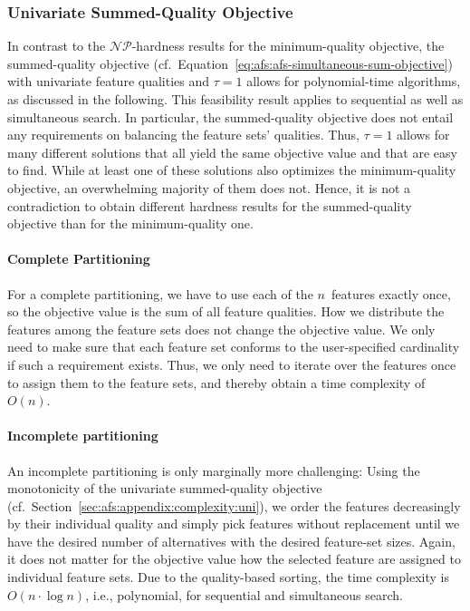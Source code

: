\documentclass{article}
\theoremstyle{definition}
\begin{document}
\subsubsection{Univariate Summed-Quality Objective}
\label{sec:afs:appendix:complexity:uni-sum}

In contrast to the $\mathcal{NP}$-hardness results for the minimum-quality objective, the summed-quality objective (cf.~Equation~\ref{eq:afs:afs-simultaneous-sum-objective}) with univariate feature qualities and $\tau=1$ allows for polynomial-time algorithms, as discussed in the following.
This feasibility result applies to sequential as well as simultaneous search.
In particular, the summed-quality objective does not entail any requirements on balancing the feature sets' qualities.
Thus, $\tau=1$ allows for many different solutions that all yield the same objective value and that are easy to find.
While at least one of these solutions also optimizes the minimum-quality objective, an overwhelming majority of them does not.
Hence, it is not a contradiction to obtain different hardness results for the summed-quality objective than for the minimum-quality one.

\paragraph{Complete Partitioning}

For a complete partitioning, we have to use each of the $n$~features exactly once, so the objective value is the sum of all feature qualities.
How we distribute the features among the feature sets does not change the objective value.
We only need to make sure that each feature set conforms to the user-specified cardinality if such a requirement exists.
Thus, we only need to iterate over the features once to assign them to the feature sets, and thereby obtain a time complexity of $O(n)$.

\paragraph{Incomplete partitioning}

An incomplete partitioning is only marginally more challenging:
Using the monotonicity of the univariate summed-quality objective (cf.~Section~\ref{sec:afs:appendix:complexity:uni}), we order the features decreasingly by their individual quality and simply pick features without replacement until we have the desired number of alternatives with the desired feature-set sizes.
Again, it does not matter for the objective value how the selected feature are assigned to individual feature sets.
Due to the quality-based sorting, the time complexity is~$O(n \cdot \log n)$, i.e., polynomial, for sequential and simultaneous search.
\end{document}
